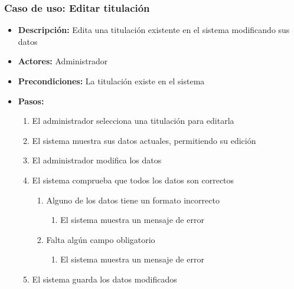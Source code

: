 \documentclass{book}
\begin{document}
\subsubsection*{Caso de uso: Editar titulación}
\begin{itemize}
\item{\bf Descripción:} Edita una titulación existente en el sistema modificando sus datos
\item{\bf Actores:} Administrador
\item{\bf Precondiciones:} La titulación existe en el sistema
\item{\bf Pasos:}
\begin{enumerate}
\item El administrador selecciona una titulación para editarla
\item El sistema muestra sus datos actuales, permitiendo su edición
\item El administrador modifica los datos
\item El sistema comprueba que todos los datos son correctos
	\begin{enumerate}
	\item Alguno de los datos tiene un formato incorrecto
		\begin{enumerate}
		\item El sistema muestra un mensaje de error
		\end{enumerate}
	\item Falta algún campo obligatorio
		\begin{enumerate}
		\item El sistema muestra un mensaje de error
		\end{enumerate}
	\end{enumerate}
\item El sistema guarda los datos modificados
\end{enumerate}
\end{itemize}
\end{document}
